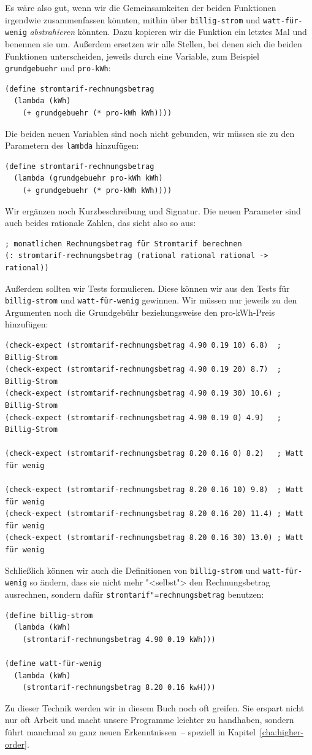 Es wäre also gut, wenn wir die Gemeinsamkeiten der beiden Funktionen
irgendwie zusammenfassen könnten, mithin über \texttt{billig-strom}
und \texttt{watt-für-wenig} \textit{abstrahieren}
könnten.  Dazu kopieren wir die Funktion ein letztes Mal und benennen
sie um.  Außerdem ersetzen wir alle Stellen, bei denen sich die beiden
Funktionen unterscheiden, jeweils durch eine Variable, zum Beispiel
\texttt{grundgebuehr} und \texttt{pro-kWh}:
%
\begin{verbatim}
(define stromtarif-rechnungsbetrag
  (lambda (kWh)
    (+ grundgebuehr (* pro-kWh kWh))))
\end{verbatim}
%
Die beiden neuen Variablen sind noch nicht gebunden, wir müssen sie zu
den Parametern des \texttt{lambda} hinzufügen:
%
\begin{verbatim}
(define stromtarif-rechnungsbetrag
  (lambda (grundgebuehr pro-kWh kWh)
    (+ grundgebuehr (* pro-kWh kWh))))
\end{verbatim}
%
Wir ergänzen noch Kurzbeschreibung und Signatur.  Die neuen Parameter
sind auch beides rationale Zahlen, das sieht also so aus:
%
\begin{verbatim}
; monatlichen Rechnungsbetrag für Stromtarif berechnen
(: stromtarif-rechnungsbetrag (rational rational rational -> rational))
\end{verbatim}
%
Außerdem sollten wir Tests formulieren.  Diese können wir aus den
Tests für \texttt{billig-strom} und \texttt{watt-für-wenig} gewinnen.
Wir müssen nur jeweils zu den Argumenten noch die Grundgebühr
beziehungsweise den pro-kWh-Preis hinzufügen:
%
\begin{verbatim}
(check-expect (stromtarif-rechnungsbetrag 4.90 0.19 10) 6.8)  ; Billig-Strom
(check-expect (stromtarif-rechnungsbetrag 4.90 0.19 20) 8.7)  ; Billig-Strom
(check-expect (stromtarif-rechnungsbetrag 4.90 0.19 30) 10.6) ; Billig-Strom
(check-expect (stromtarif-rechnungsbetrag 4.90 0.19 0) 4.9)   ; Billig-Strom

(check-expect (stromtarif-rechnungsbetrag 8.20 0.16 0) 8.2)   ; Watt für wenig

(check-expect (stromtarif-rechnungsbetrag 8.20 0.16 10) 9.8)  ; Watt für wenig
(check-expect (stromtarif-rechnungsbetrag 8.20 0.16 20) 11.4) ; Watt für wenig
(check-expect (stromtarif-rechnungsbetrag 8.20 0.16 30) 13.0) ; Watt für wenig
\end{verbatim}
%
Schließlich können wir auch die Definitionen von \texttt{billig-strom}
und \texttt{watt-für-wenig} so ändern, dass sie nicht mehr "<selbst">
den Rechnungsbetrag ausrechnen, sondern dafür
\texttt{stromtarif"=rechnungsbetrag} benutzen:
%
\begin{verbatim}
(define billig-strom
  (lambda (kWh)
    (stromtarif-rechnungsbetrag 4.90 0.19 kWh)))

(define watt-für-wenig
  (lambda (kWh)
    (stromtarif-rechnungsbetrag 8.20 0.16 kwH)))
\end{verbatim}
%
Zu dieser Technik werden wir in diesem Buch noch oft greifen.  Sie
erspart nicht nur oft Arbeit und macht unsere Programme leichter zu
handhaben, sondern führt manchmal zu ganz neuen Erkenntnissen~--
speziell in Kapitel~\ref{cha:higher-order}.

